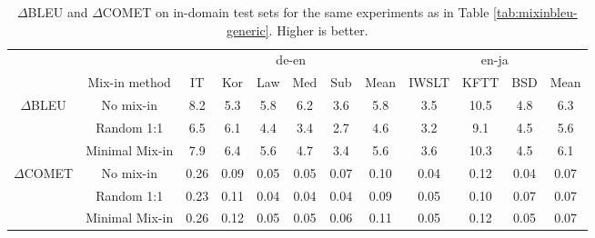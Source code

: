\documentclass[11pt]{article}
\begin{document}
\begin{table*}[h!]
    \centering
   \small 
       \begin{tabular}{cc| ccccc|c| ccc|c}
    &   &  \multicolumn{6}{c|}{de-en} &  \multicolumn{4}{c}{en-ja}\\
    & Mix-in method     & IT & Kor &Law &Med  & Sub & Mean & IWSLT  &KFTT &BSD & Mean \\

             \hline
   \multirow{3}{*}{$\Delta$BLEU}    &  No mix-in  & 8.2  & 5.3 &  5.8& 6.2& 3.6 &  5.8 & 3.5 & 10.5& 4.8& 6.3 \\
      &  Random 1:1 &6.5& 6.1&  4.4& 3.4&  2.7 &  4.6& 3.2   & 9.1 & 4.5& 5.6\\

       & Minimal Mix-in & 7.9  &6.4&  5.6& 4.7 &3.4 &  5.6&3.6    &  10.3& 4.5& 6.1\\

 \hline        
\multirow{3}{*}{$\Delta$COMET} & No mix-in   & 0.26 & 0.09  & 0.05   & 0.05& 0.07 & 0.10 &  0.04   & 0.12 & 0.04& 0.07  \\
 &       Random 1:1  & 0.23 & 0.11 &  0.04&0.04  & 0.04 & 0.09   &  0.05   & 0.10 & 0.07& 0.07  \\
  &    Minimal Mix-in  & 0.26 & 0.12 & 0.05 & 0.05 & 0.06& 0.11   &  0.05& 0.12 & 0.05 & 0.07\\
    \end{tabular}
    \caption{$\Delta$BLEU and $\Delta$COMET  on in-domain test sets for the same experiments as in Table \ref{tab:mixinbleu-generic}. Higher is better.
    }
    \label{tab:mixinbleu-indomain}
\end{table*}
\end{document}
